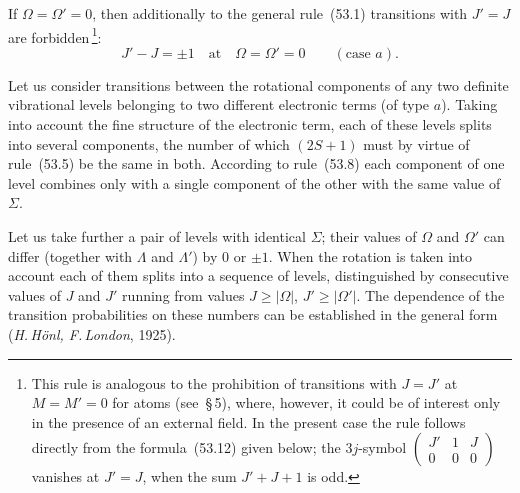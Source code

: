 If $\Omega = \Omega' = 0$, then additionally to the general rule~(53.1) transitions with $J' = J$ are forbidden\,\footnote{This rule is analogous to the prohibition of transitions with $J = J'$ at $M = M' = 0$ for atoms (see~\S\,5), where, however, it could be of interest only in the presence of an external field. In the present case the rule follows directly from the formula~(53.12) given below; the $3j$-symbol $\begin{pmatrix} J' & 1 & J \\ 0 & 0 & 0\end{pmatrix}$ vanishes at $J' = J$, when the sum $J' + J + 1$ is odd.}:
\begin{equation}
J' - J = \pm 1\quad\text{at}\quad \Omega = \Omega' = 0\qquad (\text{case } a).
\tag{53.10}
\end{equation}

Let us consider transitions between the rotational components of any two definite vibrational levels belonging to two different electronic terms (of type $a$). Taking into account the fine structure of the electronic term, each of these levels splits into several components, the number of which $(2S + 1)$ must by virtue of rule~(53.5) be the same in both. According to rule~(53.8) each component of one level combines only with a single component of the other with the same value of $\Sigma$.

Let us take further a pair of levels with identical $\Sigma$; their values of $\Omega$ and $\Omega'$ can differ (together with $\Lambda$ and $\Lambda'$) by 0 or $\pm 1$. When the rotation is taken into account each of them splits into a sequence of levels, distinguished by consecutive values of $J$ and $J'$ running from values $J \geqslant |\Omega|$, $J' \geqslant |\Omega'|$. The dependence of the transition probabilities on these numbers can be established in the general form (\textit{H.\,H\"onl, F.\,London}, 1925).

